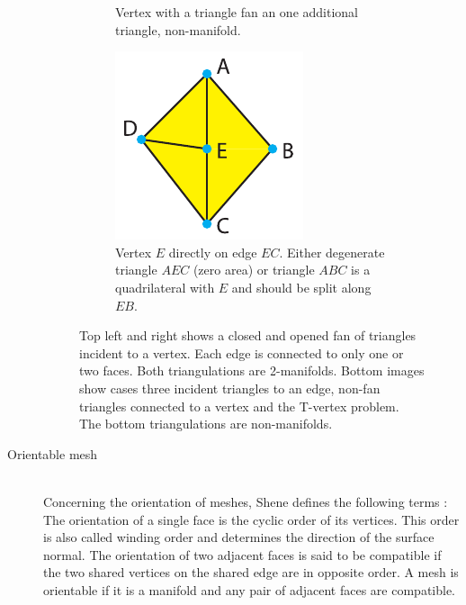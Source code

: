 \begin{description}
\begin{figure}[h]
\begin{subfigure}[b]{0.3\textwidth}
			\caption{Vertex with a triangle fan an one additional triangle, non-manifold.}
			\label{fig:non_manifold_vertex}
		\end{subfigure}
		\begin{subfigure}[b]{0.3\textwidth}
			\includegraphics[width=\textwidth]{images/t_vertex}
			\caption{Vertex $E$ directly on edge $EC$. Either degenerate triangle $AEC$ (zero area) or triangle $ABC$ is a quadrilateral with $E$ and should be split along $EB$.}
			\label{fig:t_vertex}
		\end{subfigure}
		\caption{
			Top left and right shows a closed and opened fan of triangles incident to a vertex.
			Each edge is connected to only one or two faces.
			Both triangulations are 2-manifolds.
			Bottom images show cases three incident triangles to an edge, non-fan triangles connected to a vertex and the T-vertex problem.
			The bottom triangulations are non-manifolds.
		}
		\label{fig:manifold}
	\end{figure}
	
	
	\item[Orientable mesh] \hfill \\
	Concerning the orientation of meshes, Shene defines the following terms \cite{mesh_basics}:
	The orientation of a single face is the cyclic order of its vertices.
	This order is also called winding order and determines the direction of the surface normal.
	The orientation of two adjacent faces is said to be compatible if the two shared vertices on the shared edge are in opposite order.
	A mesh is orientable if it is a manifold and any pair of adjacent faces are compatible.
	

\end{description}
